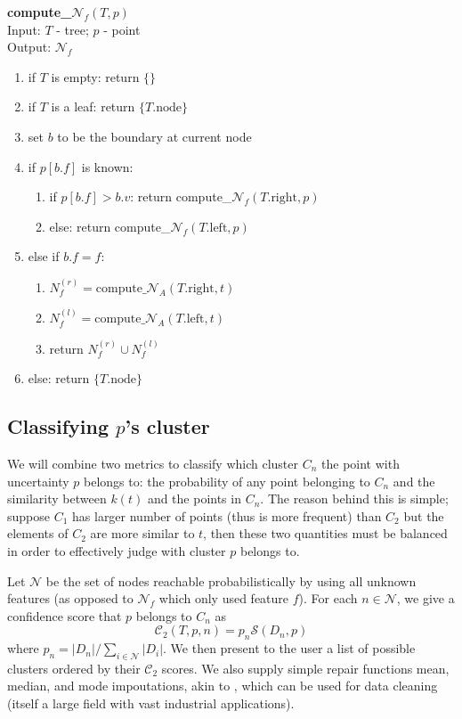\documentclass[conference]{IEEEtran}
\begin{document}
\begin{algorithm}
\textbf{compute\_$\mathcal{N}_f(T, p)$} \\
Input: $T$ - tree; $p$ - point \\
Output: $\mathcal{N}_f$
\begin{enumerate}
	\item if $T$ is empty: return $\{ \}$
	\item if $T$ is a leaf: return $\{ T.\text{node} \}$
	\item set $b$ to be the boundary at current node
	\item if $p[b.f]$ is known:
	\begin{enumerate}
		\item if $p[b.f] > b.v$: 
		return compute\_$\mathcal{N}_f(T.\text{right}, p)$
		\item else: return compute\_$\mathcal{N}_f(T.\text{left}, p)$
	\end{enumerate}
	\item else if $b.f = f$:
	\begin{enumerate}
		\item $N_{f}^{(r)} = \text{compute\_}\mathcal{N}_A(T.\text{right},t)$
		\item $N_{f}^{(l)} = \text{compute\_}\mathcal{N}_A(T.\text{left},t)$
		\item return $N_{f}^{(r)} \cup N_{f}^{(l)}$
	\end{enumerate}
	\item else: return $\{ T.\text{node} \}$
\end{enumerate}
\end{algorithm}

\subsection{Classifying $p$'s cluster}
We will combine two metrics to classify which cluster $C_n$ the point
with uncertainty $p$ belongs to: the probability of any point belonging to
$C_n$ and the similarity between $k(t)$ and the points in $C_n$. The reason
behind this is simple; suppose $C_1$ has larger number of points (thus is
more frequent) than $C_2$ but the elements of $C_2$ are more similar to
$t$, then these two quantities must be balanced in order to effectively judge
with cluster $p$ belongs to.

Let $\mathcal{N}$ be the set of nodes reachable probabilistically by using all
unknown features (as opposed to $\mathcal{N}_f$ which only used feature
$f$). For each $n \in \mathcal{N}$, we give a confidence score that
$p$ belongs to $C_n$ as
$$ \mathcal{C}_2(T,p,n) = p_n \mathcal{S}(D_n, p) $$
where $p_n = |D_n|/\sum_{i\in \mathcal{N}} |D_i|$. We then present
to the user a list of possible clusters ordered by their $\mathcal{C}_2$ scores.
We also supply simple repair functions mean, median, and mode impoutations,
akin to \cite{b4}, which can be used for data cleaning (itself a large field with
vast industrial applications).
\end{document}
